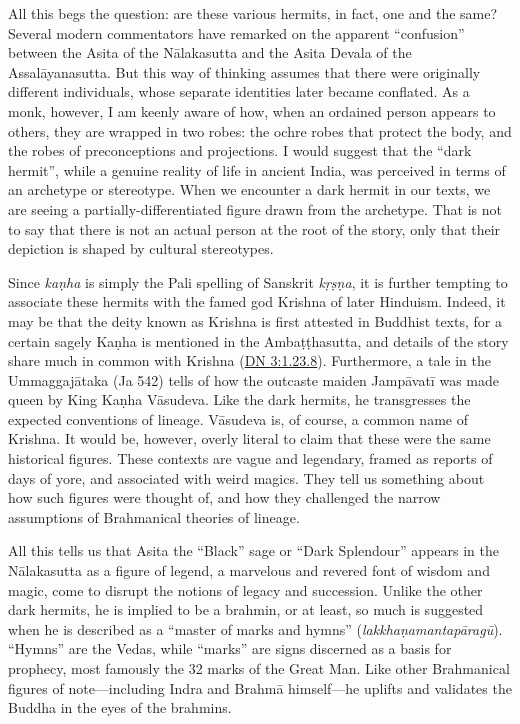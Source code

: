 \documentclass[12pt,openany]{book}%
\begin{document}
All this begs the question: are these various hermits, in fact, one and the same? Several modern commentators have remarked on the apparent “confusion” between the Asita of the \textsanskrit{Nālakasutta} and the Asita Devala of the \textsanskrit{Assalāyanasutta}. But this way of thinking assumes that there were originally different individuals, whose separate identities later became conflated. As a monk, however, I am keenly aware of how, when an ordained person appears to others, they are wrapped in two robes: the ochre robes that protect the body, and the robes of preconceptions and projections. I would suggest that the “dark hermit”, while a genuine reality of life in ancient India, was perceived in terms of an archetype or stereotype. When we encounter a dark hermit in our texts, we are seeing a partially-differentiated figure drawn from the archetype. That is not to say that there is not an actual person at the root of the story, only that their depiction is shaped by cultural stereotypes.

Since \textit{\textsanskrit{kaṇha}} is simply the Pali spelling of Sanskrit \textit{\textsanskrit{kṛṣṇa}}, it is further tempting to associate these hermits with the famed god Krishna of later Hinduism. Indeed, it may be that the deity known as Krishna is first attested in Buddhist texts, for a certain sagely \textsanskrit{Kaṇha} is mentioned in the \textsanskrit{Ambaṭṭhasutta}, and details of the story share much in common with Krishna (\href{https://suttacentral.net/dn3/en/sujato\#1.23.8}{DN 3:1.23.8}). Furthermore, a tale in the \textsanskrit{Ummaggajātaka} (Ja 542) tells of how the outcaste maiden \textsanskrit{Jampāvatī} was made queen by King \textsanskrit{Kaṇha} \textsanskrit{Vāsudeva}. Like the dark hermits, he transgresses the expected conventions of lineage. \textsanskrit{Vāsudeva} is, of course, a common name of Krishna. It would be, however, overly literal to claim that these were the same historical figures. These contexts are vague and legendary, framed as reports of days of yore, and associated with weird magics. They tell us something about how such figures were thought of, and how they challenged the narrow assumptions of Brahmanical theories of lineage.

All this tells us that Asita the “Black” sage or “Dark Splendour” appears in the \textsanskrit{Nālakasutta} as a figure of legend, a marvelous and revered font of wisdom and magic, come to disrupt the notions of legacy and succession. Unlike the other dark hermits, he is implied to be a brahmin, or at least, so much is suggested when he is described as a “master of marks and hymns” (\textit{\textsanskrit{lakkhaṇamantapāragū}}). “Hymns” are the Vedas, while “marks” are signs discerned as a basis for prophecy, most famously the 32 marks of the Great Man. Like other Brahmanical figures of note—including Indra and \textsanskrit{Brahmā} himself—he uplifts and validates the Buddha in the eyes of the brahmins.
\end{document}
